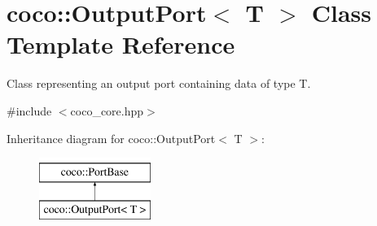 \hypertarget{classcoco_1_1_output_port}{}\section{coco\+:\+:Output\+Port$<$ T $>$ Class Template Reference}
\label{classcoco_1_1_output_port}


Class representing an output port containing data of type T.  




{\ttfamily \#include $<$coco\+\_\+core.\+hpp$>$}

Inheritance diagram for coco\+:\+:Output\+Port$<$ T $>$\+:\begin{figure}[H]
\begin{center}
\leavevmode
\includegraphics[height=2.000000cm]{classcoco_1_1_output_port}
\end{center}
\end{figure}
